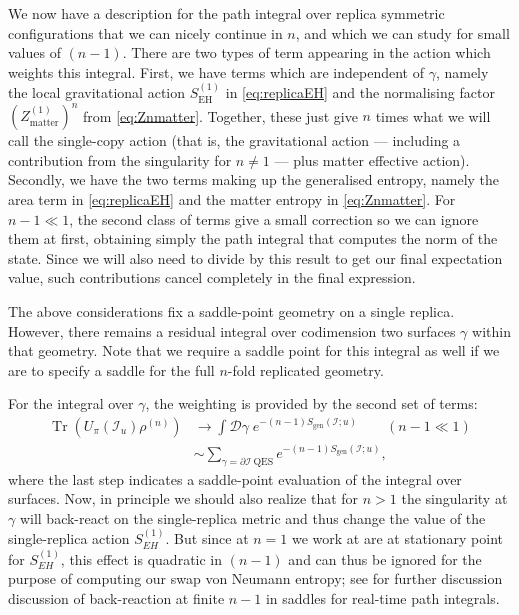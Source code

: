 \documentclass[letterpaper,12pt]{article}
\DeclareMathOperator{\Tr}{Tr}
\newcommand*{\scri}{\mathscr{I}} %
\newcommand*{\island}{\mathcal{I}}
\begin{document}
We now have a description for the path integral over replica symmetric configurations that we can nicely continue in $n$, and which we can study for small values of $(n-1)$. There are two types of term appearing in the action which weights this integral. First, we have terms which are independent of $\gamma$, namely the local gravitational action $S_\mathrm{EH}^{(1)}$  in \eqref{eq:replicaEH} and the normalising factor $\left(Z_\mathrm{matter}^{(1)}\right)^n$ from \eqref{eq:Znmatter}. Together, these just give $n$ times what we will call the single-copy action (that is, the gravitational action --- including a contribution from the singularity for $n\neq 1$ --- plus matter effective action). Secondly, we have the two terms making up the generalised entropy, namely the area term in \eqref{eq:replicaEH} and the matter entropy in \eqref{eq:Znmatter}. For $n- 1\ll 1$, the second class of terms give a small correction so we can ignore them at first, obtaining simply the path integral that computes the norm of the state.  Since we will also need to divide by this result to get our final expectation value, such contributions cancel completely in the final expression.

The above considerations fix a saddle-point geometry on a single replica.  However, there remains a residual integral over codimension two surfaces $\gamma$ within that geometry.  Note that we require a saddle point for this integral as well if we are to specify a saddle for the full $n$-fold replicated geometry.

For the integral over $\gamma$, the weighting is provided by the second set of terms:
\begin{align}
	\Tr \left( U_\pi(\scri_u) \rho^{(n)} \right) &\longrightarrow \int \mathcal{D}\gamma \; e^{-(n-1)S_\mathrm{gen}(\island;u)} \qquad (n-1 \ll 1) \label{eq:gammaint} \\
	&\sim \sum_{\gamma=\partial\island \ \mathrm{QES}} e^{-(n-1)S_\mathrm{gen}(\island;u)}, \label{eq:QESsum}
\end{align}
where the last step indicates a saddle-point evaluation of the integral over surfaces. Now, in principle we should also realize that for $n>1$  the singularity at $\gamma$ will back-react on the single-replica metric and thus change the value of the single-replica action $S_{EH}^{(1)}$.  But since at $n=1$ we work at are at stationary point for $S_{EH}^{(1)}$, this effect is quadratic in $(n-1)$ and can thus be ignored for the purpose of computing our swap von Neumann entropy; see \cite{CDMRW} for further discussion discussion of back-reaction at finite $n-1$ in saddles for real-time path integrals.
\end{document}
